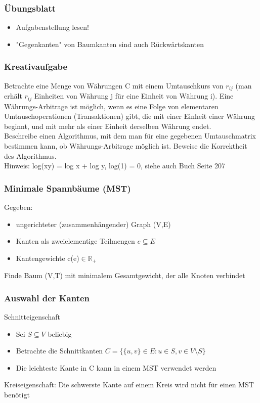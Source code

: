 

\begin{frame}
  \titlepage
\end{frame}

\begin{frame}
\frametitle{Übungsblatt}
\begin{itemize}
\item Aufgabenstellung lesen!
\item "Gegenkanten" von Baumkanten sind auch Rückwärtskanten
\end{itemize}
\end{frame}

\begin{frame}
\frametitle{Kreativaufgabe}
Betrachte eine Menge von Währungen C mit einem Umtauschkurs von $r_{ij}$ (man erhält $r_{ij}$ Einheiten von Währung j für eine Einheit von Währung i). Eine Währungs-Arbitrage ist möglich, wenn es eine Folge von elementaren Umtauschoperationen (Transaktionen) gibt, die mit einer Einheit einer Währung beginnt, und mit mehr als einer Einheit derselben Währung endet.\\
Beschreibe einen Algorithmus, mit dem man für eine gegebenen Umtauschmatrix bestimmen kann, ob Währungs-Arbitrage möglich ist. Beweise die Korrektheit des Algorithmus.\\
Hinweis: log(xy) = log x + log y, log(1) = 0, siehe auch Buch Seite 207
\end{frame}

\begin{frame}
\frametitle{Minimale Spannbäume (MST)}
Gegeben:
\begin{itemize}
\item ungerichteter (zusammenhängender) Graph (V,E)
\item Kanten als zweielementige Teilmengen $e\subseteq E$
\item Kantengewichte c(e)$\in\mathbb{R}_+$
\end{itemize}\pause
Finde Baum (V,T) mit minimalem Gesamtgewicht, der alle Knoten verbindet
\end{frame}

\begin{frame}
\frametitle{Auswahl der Kanten}
Schnitteigenschaft
\begin{itemize}
\item Sei $S\subseteq V$ beliebig
\item Betrachte die Schnittkanten $C=\{\{u,v\}\in E:u\in S,v\in V\setminus S\}$\pause
\item Die leichteste Kante in C kann in einem MST verwendet werden
\end{itemize}\pause
Kreiseigenschaft: Die schwerste Kante auf einem Kreis wird nicht für einen MST benötigt
\end{frame}

